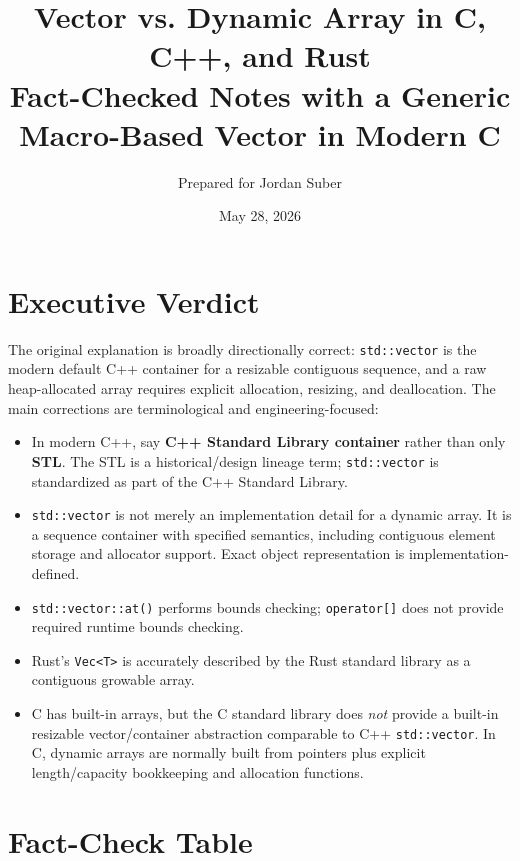\documentclass[11pt]{article}
\title{\textbf{Vector vs. Dynamic Array in C, C++, and Rust}\\
\large Fact-Checked Notes with a Generic Macro-Based Vector in Modern C}
\author{Prepared for Jordan Suber}
\date{May 28, 2026}
\begin{document}
\maketitle

\section*{Executive Verdict}

The original explanation is broadly directionally correct: \texttt{std::vector} is the modern default C++ container for a resizable contiguous sequence, and a raw heap-allocated array requires explicit allocation, resizing, and deallocation. The main corrections are terminological and engineering-focused:

\begin{itemize}
  \item In modern C++, say \textbf{C++ Standard Library container} rather than only \textbf{STL}. The STL is a historical/design lineage term; \texttt{std::vector} is standardized as part of the C++ Standard Library.
  \item \texttt{std::vector} is not merely an implementation detail for a dynamic array. It is a sequence container with specified semantics, including contiguous element storage and allocator support. Exact object representation is implementation-defined.
  \item \texttt{std::vector::at()} performs bounds checking; \texttt{operator[]} does not provide required runtime bounds checking.
  \item Rust's \texttt{Vec<T>} is accurately described by the Rust standard library as a contiguous growable array.
  \item C has built-in arrays, but the C standard library does \emph{not} provide a built-in resizable vector/container abstraction comparable to C++ \texttt{std::vector}. In C, dynamic arrays are normally built from pointers plus explicit length/capacity bookkeeping and allocation functions.
\end{itemize}

\section{Fact-Check Table}
\end{document}

